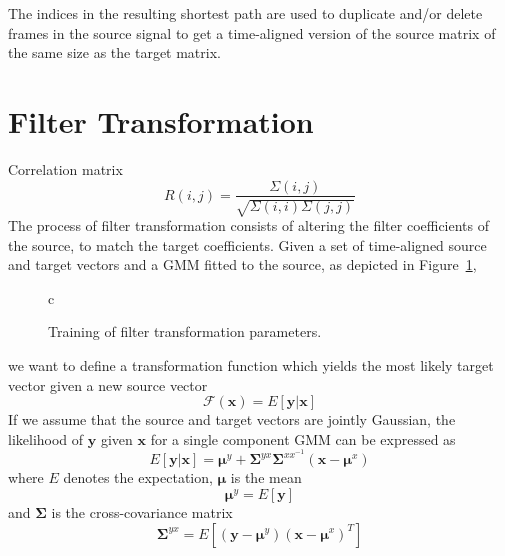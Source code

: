 The indices in the resulting shortest path are used to duplicate and/or delete frames in the source signal to get a time-aligned version of the source matrix of the same size as the target matrix.


\section{Filter Transformation} %
\label{the:conversion_function}
Correlation matrix
\begin{equation}
	R(i,j) = \frac{\Sigma(i,j)}{\sqrt{\Sigma(i,i)\Sigma(j,j)}}
\end{equation}
The process of filter transformation consists of altering the filter coefficients of the source, to match the target coefficients. Given a set of time-aligned source and target vectors and a GMM fitted to the source, as depicted in Figure~\ref{fig:VC_training}, 
\begin{figure}[htbp]
	\centering
	\begin{tabular}[h]{c}
	\end{tabular}
	\caption{Training of filter transformation parameters.}
	\label{fig:VC_training}
\end{figure}
we want to define a transformation function which yields the most likely target vector given a new source vector
\begin{equation}
	\mathcal{F}(\mathbf{x}) = E[\mathbf{y}\vert \mathbf{x}]
\end{equation}
If we assume that the source and target vectors are jointly Gaussian, the likelihood of $\mathbf{y}$ given $\mathbf{x}$ for a single component GMM can be expressed as \cite{kay93}
\begin{equation}
	E[\mathbf{y}\vert \mathbf{x}] = \boldsymbol{\mu}^y + \mathbf{\Sigma}^{yx} \mathbf{\Sigma}^{xx^{-1}} (\mathbf{x}-\boldsymbol{\mu}^x)
\end{equation}
where $E$ denotes the expectation, $\boldsymbol{\mu}$ is the mean
\begin{equation}
	\boldsymbol{\mu}^y = E[\mathbf{y}]
\end{equation}
and $\mathbf{\Sigma}$ is the cross-covariance matrix
\begin{equation}
	\mathbf{\Sigma}^{yx} = E[(\mathbf{y}-\boldsymbol{\mu}^y)(\mathbf{x}-\boldsymbol{\mu}^x)^T]
\end{equation}

